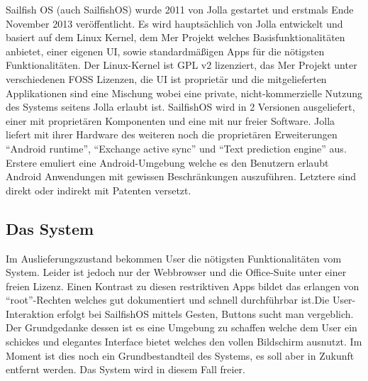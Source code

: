 Sailfish OS (auch \mbox{SailfishOS}) wurde 2011 von Jolla gestartet und erstmals Ende November 2013\thinspace\cite{online:jolla-about} veröffentlicht. Es wird hauptsächlich von Jolla entwickelt und basiert auf dem Linux Kernel, dem Mer Projekt welches Basisfunktionalitäten anbietet, einer eigenen UI, sowie standardmäßigen Apps für die nötigsten Funktionalitäten\thinspace\cite{online:sailfish-about}. Der Linux-Kernel ist GPL v2 lizenziert\thinspace\cite{online:kernel-license}, das Mer Projekt unter verschiedenen FOSS Lizenzen\thinspace\cite{online:mer-license}, die UI ist proprietär und die mitgelieferten Applikationen sind eine Mischung\thinspace\cite{online:sailfish-about} wobei eine private, nicht-kommerzielle Nutzung des Systems seitens Jolla erlaubt ist\thinspace\cite{online:sailfish-eula}. \mbox{SailfishOS} wird in 2 Versionen ausgeliefert, einer mit proprietären Komponenten und eine mit nur freier Software. Jolla liefert mit ihrer Hardware des weiteren noch die proprietären Erweiterungen\thinspace\cite{online:sailfish-about} ``Android runtime''\thinspace\cite{online:sailfish-android-runtime-licensor}, ``Exchange active sync''\thinspace\cite{online:microsoft-eas} und ``Text prediction engine''\thinspace\cite{online:jolla-xt9}\thinspace\cite{online:xt9-license} aus. Erstere emuliert eine Android-Umgebung welche es den Benutzern erlaubt Android Anwendungen mit gewissen Beschränkungen auszuführen\thinspace\cite{online:sailfish-android-runtime}. Letztere sind direkt oder indirekt mit Patenten versetzt.
\newline

\subsection{Das System}
Im Auslieferungszustand bekommen User die nötigsten Funktionalitäten vom System. Leider ist jedoch nur der Webbrowser und die Office-Suite unter einer freien Lizenz\thinspace\cite{online:sailfish-about}. Einen Kontrast zu diesen restriktiven Apps bildet das erlangen von ``root''-Rechten welches gut dokumentiert und schnell durchführbar ist\thinspace\cite{online:sailfish-root}.Die User-Interaktion erfolgt bei SailfishOS mittels Gesten, Buttons sucht man vergeblich. Der Grundgedanke dessen ist es eine Umgebung zu schaffen welche dem User ein schickes und elegantes Interface bietet welches den vollen Bildschirm ausnutzt\thinspace\cite{online:sailfish-ui}. Im Moment ist dies noch ein Grundbestandteil des Systems, es soll aber in Zukunft entfernt werden\thinspace\cite{online:sailfish-about}. Das System wird in diesem Fall freier. 

